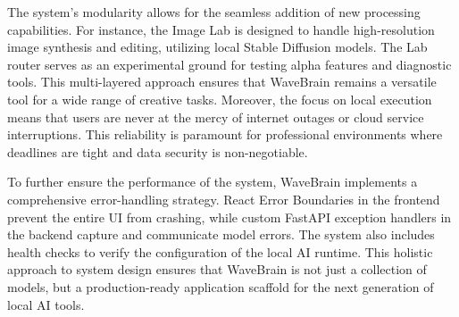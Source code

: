 \documentclass[12pt,a4paper]{article}
\begin{document}
The system's modularity allows for the seamless addition of new processing capabilities. For instance, the Image Lab is designed to handle high-resolution image synthesis and editing, utilizing local Stable Diffusion models. The Lab router serves as an experimental ground for testing alpha features and diagnostic tools. This multi-layered approach ensures that WaveBrain remains a versatile tool for a wide range of creative tasks. Moreover, the focus on local execution means that users are never at the mercy of internet outages or cloud service interruptions. This reliability is paramount for professional environments where deadlines are tight and data security is non-negotiable.

To further ensure the performance of the system, WaveBrain implements a comprehensive error-handling strategy. React Error Boundaries in the frontend prevent the entire UI from crashing, while custom FastAPI exception handlers in the backend capture and communicate model errors. The system also includes health checks to verify the configuration of the local AI runtime. This holistic approach to system design ensures that WaveBrain is not just a collection of models, but a production-ready application scaffold for the next generation of local AI tools.
\end{document}
